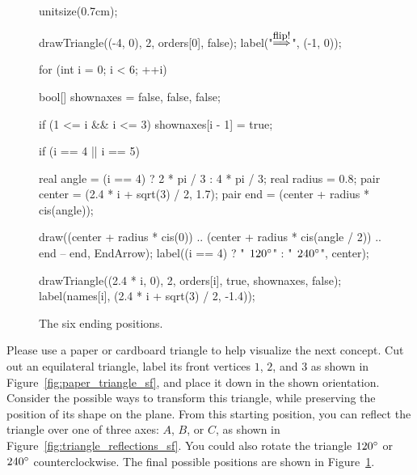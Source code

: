 \documentclass[../gatm.tex]{subfiles}
\begin{document}
\begin{figure}[h]
	\begin{center}
		\begin{minipage}[b]{\textwidth}
			\centering
			\begin{asy}[width=0.5\textwidth]
				unitsize(0.7cm);
				
				drawTriangle((-4, 0), 2, orders[0], false);
				label("$\stackrel{\mbox{\small flip!}}{\Longrightarrow}$", (-1, 0));
				
				for (int i = 0; i < 6; ++i) {
					bool[] shownaxes = {false, false, false};
					
					if (1 <= i && i <= 3) {
						shownaxes[i - 1] = true;
					}
					
					if (i == 4 || i == 5) {
						real angle = (i == 4) ? 2 * pi / 3 : 4 * pi / 3;
						real radius = 0.8;
						pair center = (2.4 * i + sqrt(3) / 2, 1.7);
						pair end = (center + radius * cis(angle));
						
						draw((center + radius * cis(0)) .. (center + radius * cis(angle / 2)) .. end -- end, EndArrow);
						label((i == 4) ? "$\phantom{\degree}120\degree$" : "$\phantom{\degree}240\degree$", center);
					}
					
					drawTriangle((2.4 * i, 0), 2, orders[i], true, shownaxes, false);
					label(names[i], (2.4 * i + sqrt(3) / 2, -1.4));
				}
			\end{asy}
		\end{minipage}
	\end{center}
	\vspace*{-2\baselineskip}
	\begin{center}
		\begin{minipage}[t]{\textwidth}
			\caption{The six ending positions.}
			\label{fig:triangle_isos_sf}
		\end{minipage}
	\end{center}
\end{figure}



\noindent Please use a paper or cardboard triangle to help visualize the next concept. Cut out an equilateral triangle, label its front vertices $1$, $2$, and $3$ as shown in Figure~\ref{fig:paper_triangle_sf}, and place it down in the shown orientation. Consider the possible ways to transform this triangle, while preserving the position of its shape on the plane. From this starting position, you can reflect the triangle over one of three axes: $A$, $B$, or $C$, as shown in Figure~\ref{fig:triangle_reflections_sf}. You could also rotate the triangle $120^\circ{}$ or $240^\circ{}$ counterclockwise. The final possible positions are shown in Figure~\ref{fig:triangle_isos_sf}.
\end{document}
